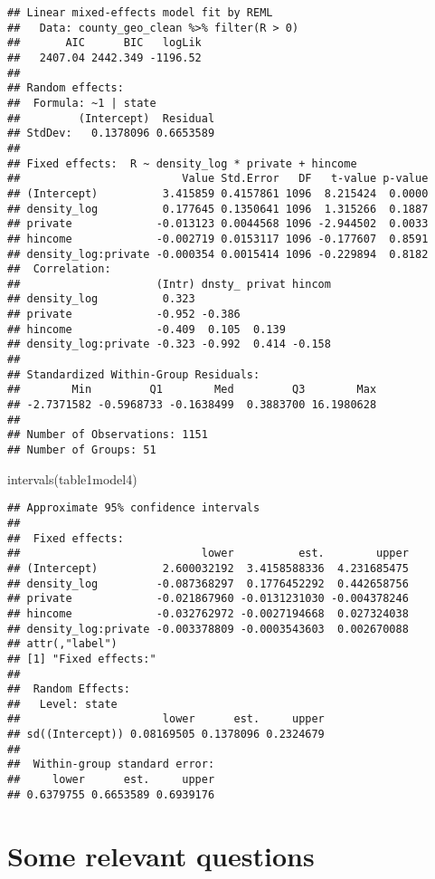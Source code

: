 \documentclass[10pt,letterpaper]{article}
\newenvironment{Shaded}{\begin{snugshade}}{\end{snugshade}}
\newcommand{\FunctionTok}[1]{\textcolor[rgb]{0.00,0.00,0.00}{#1}}
\newcommand{\NormalTok}[1]{#1}
\begin{document}
\begin{verbatim}
## Linear mixed-effects model fit by REML
##   Data: county_geo_clean %>% filter(R > 0) 
##       AIC      BIC   logLik
##   2407.04 2442.349 -1196.52
## 
## Random effects:
##  Formula: ~1 | state
##         (Intercept)  Residual
## StdDev:   0.1378096 0.6653589
## 
## Fixed effects:  R ~ density_log * private + hincome 
##                         Value Std.Error   DF   t-value p-value
## (Intercept)          3.415859 0.4157861 1096  8.215424  0.0000
## density_log          0.177645 0.1350641 1096  1.315266  0.1887
## private             -0.013123 0.0044568 1096 -2.944502  0.0033
## hincome             -0.002719 0.0153117 1096 -0.177607  0.8591
## density_log:private -0.000354 0.0015414 1096 -0.229894  0.8182
##  Correlation: 
##                     (Intr) dnsty_ privat hincom
## density_log          0.323                     
## private             -0.952 -0.386              
## hincome             -0.409  0.105  0.139       
## density_log:private -0.323 -0.992  0.414 -0.158
## 
## Standardized Within-Group Residuals:
##        Min         Q1        Med         Q3        Max 
## -2.7371582 -0.5968733 -0.1638499  0.3883700 16.1980628 
## 
## Number of Observations: 1151
## Number of Groups: 51
\end{verbatim}

\begin{Shaded}
\begin{Highlighting}[]
\FunctionTok{intervals}\NormalTok{(table1model4)}
\end{Highlighting}
\end{Shaded}

\begin{verbatim}
## Approximate 95% confidence intervals
## 
##  Fixed effects:
##                            lower          est.        upper
## (Intercept)          2.600032192  3.4158588336  4.231685475
## density_log         -0.087368297  0.1776452292  0.442658756
## private             -0.021867960 -0.0131231030 -0.004378246
## hincome             -0.032762972 -0.0027194668  0.027324038
## density_log:private -0.003378809 -0.0003543603  0.002670088
## attr(,"label")
## [1] "Fixed effects:"
## 
##  Random Effects:
##   Level: state 
##                      lower      est.     upper
## sd((Intercept)) 0.08169505 0.1378096 0.2324679
## 
##  Within-group standard error:
##     lower      est.     upper 
## 0.6379755 0.6653589 0.6939176
\end{verbatim}

\hypertarget{some-relevant-questions}{%
\section{Some relevant questions}\label{some-relevant-questions}}
\end{document}
